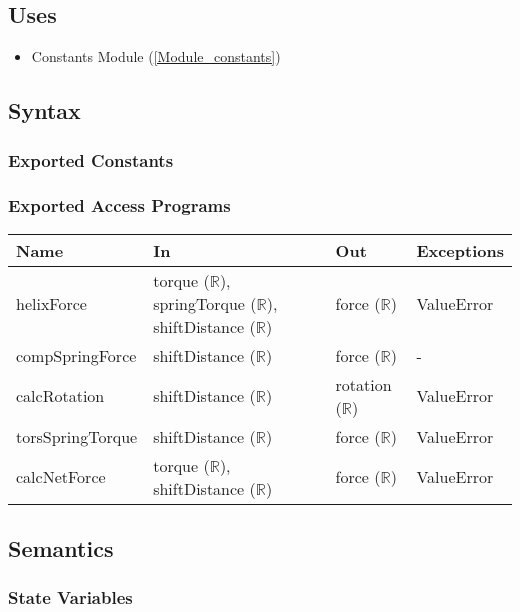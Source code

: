 \documentclass[12pt, titlepage]{article}
\begin{document}
\subsection{Uses}

\begin{itemize}
  \item Constants Module (\ref{Module_constants})
\end{itemize}

\subsection{Syntax}

\subsubsection{Exported Constants}

\subsubsection{Exported Access Programs}

\begin{center}
\begin{tabular}{p{3cm} p{4cm} p{4cm} p{2cm}}
\hline
\textbf{Name} & \textbf{In} & \textbf{Out} & \textbf{Exceptions} \\
\hline
helixForce & torque ($\mathbb{R}$), springTorque ($\mathbb{R}$), shiftDistance ($\mathbb{R}$) & force ($\mathbb{R}$) & ValueError \\
compSpringForce & shiftDistance ($\mathbb{R}$) & force ($\mathbb{R}$) & - \\
calcRotation & shiftDistance ($\mathbb{R}$) & rotation ($\mathbb{R}$) & ValueError \\
torsSpringTorque & shiftDistance ($\mathbb{R}$) & force ($\mathbb{R}$) & ValueError \\
calcNetForce & torque ($\mathbb{R}$), shiftDistance ($\mathbb{R}$) & force ($\mathbb{R}$) & ValueError\\
\hline
\end{tabular}
\end{center}

\subsection{Semantics}

\subsubsection{State Variables}
\end{document}
